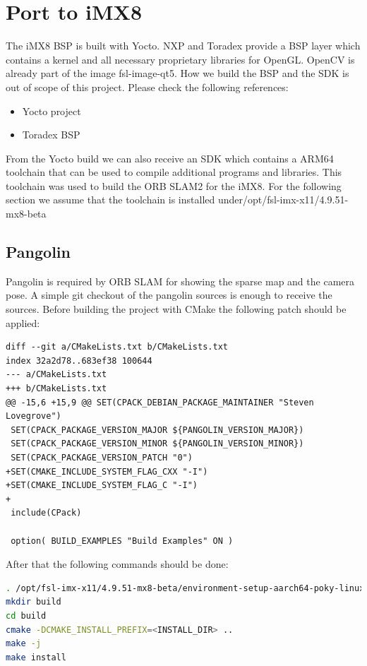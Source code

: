 \documentclass[11pt,a4paper,titlepage,oneside]{report}
\begin{document}
\section{Port to iMX8}\label{sec:orbport}

The iMX8 BSP is built with Yocto. NXP and Toradex provide a BSP layer which contains a kernel and all necessary proprietary libraries for OpenGL. OpenCV is already part of the image fsl-image-qt5. How we build the BSP and the SDK is out of scope of this project. Please check the following references:\\
\begin{itemize}
	\item Yocto project \cite{yocto}
	\item Toradex BSP \cite{toradex_bsp}
\end{itemize}

From the Yocto build we can also receive an SDK which contains a ARM64 toolchain that can be used to compile additional programs and libraries. This toolchain was used to build the ORB SLAM2 for the iMX8. For the following section we assume that the toolchain is installed under/opt/fsl-imx-x11/4.9.51-mx8-beta

\subsection{Pangolin}
Pangolin \cite{pangolin} is required by ORB SLAM for showing the sparse map and the camera pose. A simple git checkout of the pangolin sources is enough to receive the sources. Before building the project with CMake the following patch should be applied:
\begin{lstlisting}
diff --git a/CMakeLists.txt b/CMakeLists.txt
index 32a2d78..683ef38 100644
--- a/CMakeLists.txt
+++ b/CMakeLists.txt
@@ -15,6 +15,9 @@ SET(CPACK_DEBIAN_PACKAGE_MAINTAINER "Steven Lovegrove")
 SET(CPACK_PACKAGE_VERSION_MAJOR ${PANGOLIN_VERSION_MAJOR})
 SET(CPACK_PACKAGE_VERSION_MINOR ${PANGOLIN_VERSION_MINOR})
 SET(CPACK_PACKAGE_VERSION_PATCH "0")
+SET(CMAKE_INCLUDE_SYSTEM_FLAG_CXX "-I")
+SET(CMAKE_INCLUDE_SYSTEM_FLAG_C "-I")
+
 include(CPack)
 
 option( BUILD_EXAMPLES "Build Examples" ON )
\end{lstlisting}

After that the following commands should be done:
\begin{lstlisting}[language=bash]
. /opt/fsl-imx-x11/4.9.51-mx8-beta/environment-setup-aarch64-poky-linux
mkdir build
cd build
cmake -DCMAKE_INSTALL_PREFIX=<INSTALL_DIR> ..
make -j
make install
\end{lstlisting}
\end{document}
